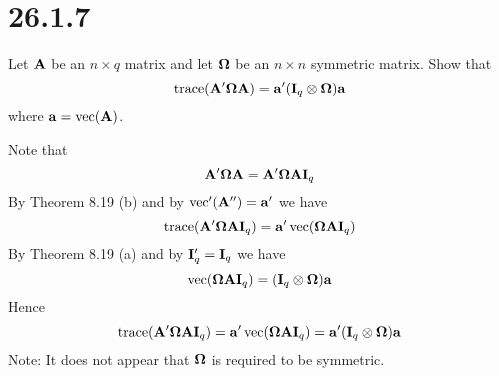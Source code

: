 \section*{26.1.7}
Let $\bf A$ be an $n\times q$ matrix and let $\bf\Omega$ be an
$n\times n$ symmetric matrix.
Show that
$$\mathop{\rm trace}({\bf A}'{\bf\Omega}{\bf A})={\bf a}'({\bf I}_q
\otimes{\bf\Omega}){\bf a}$$
where ${\bf a}=\mathop{\rm vec}({\bf A})$.

\bigskip
\noindent
Note that
$${\bf A}'{\bf\Omega}{\bf A}={\bf A}'{\bf\Omega}{\bf A}{\bf I}_q$$
By Theorem 8.19 (b) and by
$\mathop{\rm vec}'({\bf A}'')={\bf a}'$ we have
$$\mathop{\rm trace}({\bf A}'{\bf\Omega}{\bf A}{\bf I}_q)
={\bf a}'\mathop{\rm vec}({\bf\Omega}{\bf A}{\bf I}_q)$$
By Theorem 8.19 (a) and by ${\bf I}'_q={\bf I}_q$ we have
$$\mathop{\rm vec}({\bf\Omega}{\bf A}{\bf I}_q)
=({\bf I}_q\otimes{\bf\Omega}){\bf a}$$
Hence
$$\mathop{\rm trace}({\bf A}'{\bf\Omega}{\bf A}{\bf I}_q)
={\bf a}'\mathop{\rm vec}({\bf\Omega}{\bf A}{\bf I}_q)
={\bf a}'({\bf I}_q
\otimes{\bf\Omega}){\bf a}$$
Note: It does not appear that $\bf\Omega$ is required to be symmetric.
